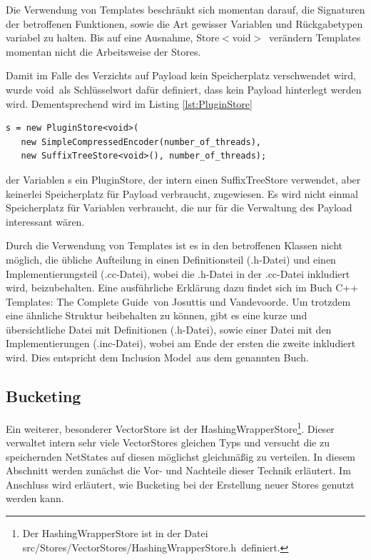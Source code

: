 \documentclass[12pt,a4paper,titlepage]{scrartcl}
\renewcommand \( {\left (}
\renewcommand \) {\right )}
\renewcommand \[ {\left [}
\renewcommand \] {\right ]}
\newcommand \Flqq {\flqq\ }
\begin{document}
Die Verwendung von Templates beschränkt sich momentan darauf, die Signaturen der betroffenen Funktionen, sowie die Art gewisser Variablen und Rückgabetypen variabel zu halten. Bis auf eine Ausnahme,
\frqq Store$<$void$>$\Flqq verändern Templates momentan nicht die Arbeitsweise der Stores.

Damit im Falle des Verzichts auf Payload kein Speicherplatz verschwendet wird, wurde \frqq void\Flqq als Schlüsselwort dafür definiert, dass kein Payload hinterlegt werden wird. Dementsprechend wird im Listing \ref{lst:PluginStore}

\begin{center}
\begin{minipage}{0.7\textwidth}
\lstset{language=C++}
\begin{lstlisting}[label=lst:PluginStore,caption={Erstellung eines PluginStores}]
s = new PluginStore<void>(
   new SimpleCompressedEncoder(number_of_threads),
   new SuffixTreeStore<void>(), number_of_threads);\end{lstlisting}
\end{minipage}
\end{center}
%
der Variablen s ein PluginStore, der intern einen SuffixTreeStore verwendet, aber keinerlei Speicherplatz für Payload verbraucht, zugewiesen. Es wird nicht einmal Speicherplatz für Variablen verbraucht, die nur für die Verwaltung des Payload interessant wären.

Durch die Verwendung von Templates ist es in den betroffenen Klassen nicht möglich, die übliche Aufteilung in einen Definitionsteil (.h-Datei) und einen Implementierungsteil (.cc-Datei), wobei die .h-Datei in der .cc-Datei inkludiert wird, beizubehalten. Eine ausführliche Erklärung dazu findet sich im Buch \frqq C++ Templates: The Complete Guide\Flqq von Josuttis und Vandevoorde. Um trotzdem eine ähnliche Struktur beibehalten zu können, gibt es eine kurze und übersichtliche Datei mit Definitionen (.h-Datei), sowie einer Datei mit den Implementierungen (.inc-Datei), wobei am Ende der ersten die zweite inkludiert wird. Dies entspricht dem \frqq Inclusion Model\Flqq aus dem genannten Buch.

\subsection{Bucketing}
Ein weiterer, besonderer VectorStore ist der \frqq HashingWrapperStore\flqq\footnote{Der HashingWrapperStore ist in der Datei \frqq src/Stores/VectorStores/HashingWrapperStore.h\Flqq definiert.}. Dieser verwaltet intern sehr viele VectorStores gleichen Typs und versucht die zu speichernden NetStates auf diesen möglichst gleichmäßig zu verteilen. In diesem Abschnitt werden zunächst die Vor- und Nachteile dieser Technik erläutert. Im Anschluss wird erläutert, wie Bucketing bei der Erstellung neuer Stores genutzt werden kann.
\end{document}
